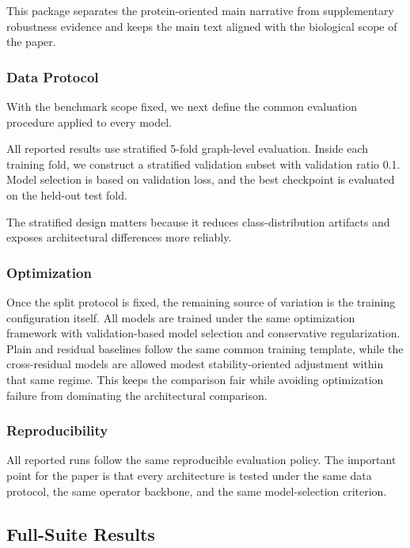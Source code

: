This package separates the protein-oriented main narrative from supplementary robustness evidence and keeps the main text aligned with the biological scope of the paper.

\subsubsection{Data Protocol}

With the benchmark scope fixed, we next define the common evaluation procedure applied to every model.

All reported results use stratified 5-fold graph-level evaluation. Inside each training fold, we construct a stratified validation subset with validation ratio 0.1. Model selection is based on validation loss, and the best checkpoint is evaluated on the held-out test fold.

The stratified design matters because it reduces class-distribution artifacts and exposes architectural differences more reliably.

\subsubsection{Optimization}

Once the split protocol is fixed, the remaining source of variation is the training configuration itself. All models are trained under the same optimization framework with validation-based model selection and conservative regularization. Plain and residual baselines follow the same common training template, while the cross-residual models are allowed modest stability-oriented adjustment within that same regime. This keeps the comparison fair while avoiding optimization failure from dominating the architectural comparison.

\subsubsection{Reproducibility}

All reported runs follow the same reproducible evaluation policy. The important point for the paper is that every architecture is tested under the same data protocol, the same operator backbone, and the same model-selection criterion.

\subsection{Full-Suite Results}


